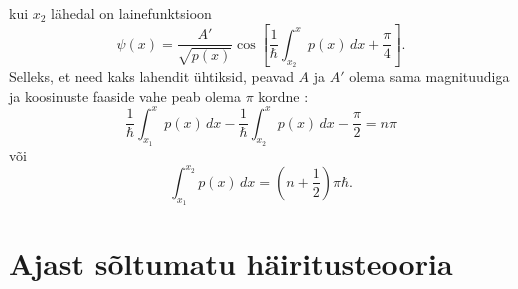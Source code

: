 \documentclass{trkut}%
\begin{document}
kui $x_2$ lähedal on lainefunktsioon
\begin{equation}
    \psi(x)=\frac{A'}{\sqrt{p(x)}} \cos \left[ \frac{1}{\hbar}\int_{x_2}^{x} p(x)\, dx + \frac{\pi}{4} \right].
\end{equation}
Selleks, et need kaks lahendit ühtiksid, peavad $A$ ja $A'$ olema sama magnituudiga ja koosinuste faaside vahe peab olema $\pi$ kordne \parencite[446]{shankar94}:
\begin{equation}
    \frac{1}{\hbar}\int_{x_1}^{x} p(x)\, dx - \frac{1}{\hbar}\int_{x_2}^{x} p(x)\, dx - \frac{\pi}{2} = n\pi
\end{equation}
või
\begin{equation}
    \int_{x_1}^{x_2} p(x)\, dx =\left(n+\frac{1}{2}\right)\pi \hbar.
\end{equation}



\section{Ajast sõltumatu häiritusteooria}
\end{document}
